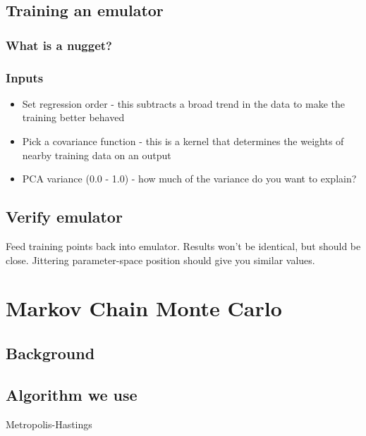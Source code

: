 \documentclass{article}
\begin{document}
\subsection{Training an emulator}

\subsubsection{What is a nugget?}

\subsubsection{Inputs}

\begin{itemize}

\item Set regression order - this subtracts a broad trend in the data to make the training better behaved

\item Pick a covariance function - this is a kernel that determines the weights of nearby training data on an output

\item PCA variance (0.0 - 1.0) - how much of the variance do you want to explain?

\end{itemize}

\subsection{Verify emulator}

Feed training points back into emulator. Results won't be identical, but should be close. Jittering parameter-space position should give you similar values.

\section{Markov Chain Monte Carlo}

\subsection{Background}

\subsection{Algorithm we use}

Metropolis-Hastings
\end{document}
